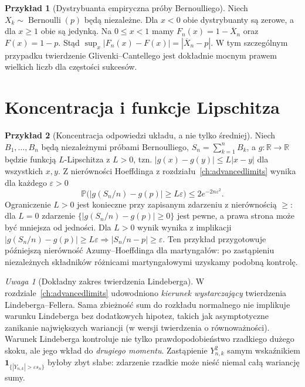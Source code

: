 \documentclass[11pt,a4paper,oneside]{report}
\numberwithin{equation}{chapter}
\theoremstyle{plain}
\theoremstyle{definition}
\newtheorem{przyklad}{Przykład}[chapter]
\theoremstyle{remark}
\newtheorem{uwaga}{Uwaga}[chapter]
\newcommand{\R}{\mathbb{R}}
\newcommand{\Prob}{\mathbb{P}}
\newcommand{\ind}[1]{\mathbf{1}_{#1}}
\begin{document}
\begin{przyklad}[Dystrybuanta empiryczna próby Bernoulliego]
Niech $X_k\sim\operatorname{Bernoulli}(p)$ będą
niezależne. Dla $x<0$ obie dystrybuanty są zerowe,
a dla $x\geq1$ obie są jedynką. Na $0\leq x<1$
mamy $F_n(x)=1-\overline X_n$ oraz $F(x)=1-p$.
Stąd
$\sup_x|F_n(x)-F(x)|=|\overline X_n-p|$.
W tym szczególnym przypadku twierdzenie
Glivenki--Cantellego jest dokładnie mocnym prawem
wielkich liczb dla częstości sukcesów.
\end{przyklad}

\section{Koncentracja i funkcje Lipschitza}

\begin{przyklad}[Koncentracja odpowiedzi układu, a nie tylko średniej]
Niech $B_1,\ldots,B_n$ będą niezależnymi próbami Bernoulliego,
$S_n=\sum_{k=1}^n B_k$, a $g:\R\to\R$ będzie
funkcją $L$-Lipschitza z $L>0$, tzn.
$|g(x)-g(y)|\leq L|x-y|$ dla wszystkich $x,y$.
Z nierówności Hoeffdinga z rozdziału~\ref{ch:advancedlimits}
wynika dla każdego $\varepsilon>0$
\[
\Prob\bigl(|g(S_n/n)-g(p)|\geq L\varepsilon\bigr)
\leq 2e^{-2n\varepsilon^2}.
\]
Ograniczenie $L>0$ jest konieczne przy zapisanym
zdarzeniu z nierównością $\geq$: dla $L=0$
zdarzenie $\{|g(S_n/n)-g(p)|\geq0\}$ jest pewne,
a prawa strona może być mniejsza od jedności.
Dla $L>0$ wynik wynika z implikacji
$|g(S_n/n)-g(p)|\geq L\varepsilon\Longrightarrow
|S_n/n-p|\geq\varepsilon$.
Ten przykład przygotowuje późniejszą nierówność
Azumy--Hoeffdinga dla martyngałów: po zastąpieniu
niezależnych składników różnicami martyngałowymi
uzyskamy podobną kontrolę.
\end{przyklad}

\begin{uwaga}[Dokładny zakres twierdzenia Lindeberga]
W rozdziale~\ref{ch:advancedlimits} udowodniono
\emph{kierunek wystarczający} twierdzenia Lindeberga--Fellera.
Sama zbieżność sum do rozkładu normalnego nie implikuje
warunku Lindeberga bez dodatkowych hipotez, takich jak
asymptotyczne zanikanie największych wariancji
(w wersji twierdzenia o równoważności).
Warunek Lindeberga kontroluje nie tylko prawdopodobieństwo
rzadkiego dużego skoku, ale jego wkład do \emph{drugiego momentu}.
Zastąpienie $Y_{n,k}^2$ samym wskaźnikiem
$\ind{\{|Y_{n,k}|>\varepsilon s_n\}}$
byłoby zbyt słabe: zdarzenie rzadkie może nieść
niemal całą wariancję sumy.
\end{uwaga}
\end{document}
